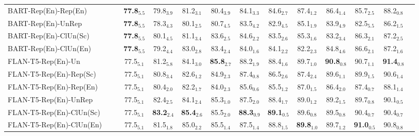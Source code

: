 \documentclass[11pt]{article}
\theoremstyle{definition}
\begin{document}
\begin{table*}[hbt]
{\begin{tabular}{l|ccccccccccccc}
BART-Rep(En)-Rep(En) &
& & \textbf{77.8}$_{5.5}$ & 79.8$_{3.9}$ & 81.2$_{3.1}$ & 80.4$_{3.9}$ & 84.1$_{3.3}$ & 84.6$_{2.7}$ & 87.4$_{1.2}$ & 86.4$_{1.4}$ & 85.7$_{2.5}$ & 88.2$_{0.8}$ & \\

BART-Rep(En)-UnRep &
& & \textbf{77.8}$_{5.5}$ & 78.3$_{4.3}$ & 80.1$_{2.5}$ & 80.7$_{4.5}$ & 83.5$_{4.2}$ & 82.9$_{4.5}$ & 85.1$_{1.9}$ & 83.9$_{4.9}$ & 82.5$_{5.5}$ & 86.2$_{1.5}$ & \\

BART-Rep(En)-ClUn(Sc) &
& & \textbf{77.8}$_{5.5}$ & 80.1$_{4.5}$ & 81.1$_{3.4}$ & 83.6$_{2.5}$ & 84.6$_{2.2}$ & 83.5$_{2.6}$ & 85.3$_{1.6}$ & 83.2$_{3.4}$ & 86.3$_{2.1}$ & 87.2$_{2.5}$ & \\

BART-Rep(En)-ClUn(En) &
& & \textbf{77.8}$_{5.5}$ & 79.2$_{4.4}$ & 83.0$_{2.8}$ & 83.4$_{2.4}$ & 84.0$_{1.6}$ & 84.1$_{2.2}$ & 82.2$_{2.3}$ & 84.8$_{4.6}$ & 86.6$_{2.1}$ & 87.2$_{1.6}$ & \\

\hdashline[1pt/4pt]

FLAN-T5-Rep(En)-Un &
& & 77.5$_{5.1}$ & 81.2$_{5.8}$ & 84.1$_{3.0}$ & \textbf{85.8}$_{2.7}$ & 88.2$_{1.9}$ & 88.4$_{1.6}$ & 89.7$_{1.0}$ & \textbf{90.8}$_{0.8}$ & 90.7$_{1.1}$ & \textbf{91.4}$_{0.8}$ & \\

FLAN-T5-Rep(En)-Rep(Sc) &
& & 77.5$_{5.1}$ & 80.8$_{3.4}$ & 82.6$_{1.2}$ & 84.9$_{2.3}$ & 87.4$_{0.8}$ & 86.5$_{2.6}$ & 87.4$_{2.4}$ & 89.6$_{1.1}$ & 89.9$_{1.5}$ & 90.6$_{1.4}$ & \\

FLAN-T5-Rep(En)-Rep(En) &
& & 77.5$_{5.1}$ & 80.4$_{2.0}$ & 82.2$_{1.7}$ & 84.0$_{2.3}$ & 85.6$_{0.6}$ & 85.5$_{1.2}$ & 87.0$_{1.5}$ & 86.4$_{2.0}$ & 87.4$_{0.7}$ & 88.1$_{1.4}$ & \\

FLAN-T5-Rep(En)-UnRep &
& & 77.5$_{5.1}$ & 82.4$_{2.5}$ & 84.1$_{2.4}$ & 85.3$_{1.0}$ & 87.5$_{2.0}$ & 88.4$_{1.7}$ & 89.0$_{1.2}$ & 89.2$_{1.5}$ & 89.7$_{0.8}$ & 90.1$_{0.5}$ & \\

FLAN-T5-Rep(En)-ClUn(Sc) &
& & 77.5$_{5.1}$ & \textbf{83.2}$_{2.4}$ & \textbf{85.4}$_{2.6}$ & 85.5$_{2.0}$ & \textbf{88.3}$_{0.9}$ & \textbf{89.1}$_{0.5}$ & 89.6$_{0.8}$ & 89.5$_{0.8}$ & 90.4$_{0.7}$ & 90.4$_{0.7}$ & \\

FLAN-T5-Rep(En)-ClUn(En) &
& & 77.5$_{5.1}$ & 81.5$_{1.8}$ & 85.0$_{2.2}$ & 85.5$_{1.4}$ & 87.5$_{1.4}$ & 88.8$_{1.5}$ & \textbf{89.8}$_{1.0}$ & 89.7$_{1.2}$ & \textbf{91.0}$_{0.5}$ & 90.8$_{0.8}$ & \\


\end{tabular}}
\end{table*}
\end{document}
